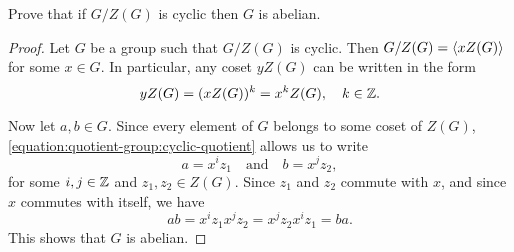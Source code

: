  Prove that if $G/Z(G)$ is cyclic then $G$ is abelian.
\begin{proof}
  Let $G$ be a group such that $G/Z(G)$ is cyclic. Then
  $G/Z(G) = \langle{xZ(G)}\rangle$ for some $x\in G$. In particular, any coset
  $yZ(G)$ can be written in the form
  \begin{equation}
    \label{equation:quotient-group:cyclic-quotient}
    yZ(G) = (xZ(G))^k = x^kZ(G),
    \quad k\in\mathbb{Z}.
  \end{equation}

  Now let $a,b\in G$. Since every element of $G$ belongs to some coset
  of $Z(G)$, \eqref{equation:quotient-group:cyclic-quotient} allows us
  to write
  \begin{equation*}
    a = x^iz_1
    \quad\text{and}\quad
    b = x^jz_2,
  \end{equation*}
  for some $i,j\in\mathbb{Z}$ and $z_1,z_2\in Z(G)$. Since $z_1$ and $z_2$
  commute with $x$, and since $x$ commutes with itself, we have
  \begin{equation*}
    ab = x^iz_1x^jz_2 = x^jz_2x^iz_1 = ba.
  \end{equation*}
  This shows that $G$ is abelian.
\end{proof}
